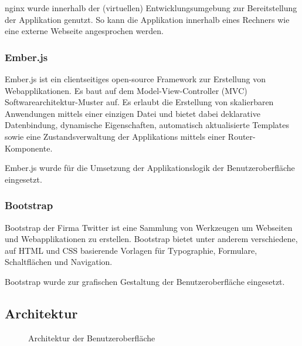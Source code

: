 nginx wurde innerhalb der (virtuellen) Entwicklungsumgebung zur Bereitstellung der Applikation genutzt. So kann die Applikation innerhalb eines Rechners wie eine externe Webseite angesprochen werden.

\subsubsection{Ember.js}
\label{ssubsec:komponenten:gui:komponenten:emberjs}
Ember.js ist ein clientseitiges open-source Framework zur Erstellung von Webapplikationen. Es baut auf dem Model-View-Controller (MVC) Softwarearchitektur-Muster auf. Es erlaubt die Erstellung von skalierbaren Anwendungen mittels einer einzigen Datei und bietet dabei deklarative Datenbindung, dynamische Eigenschaften, automatisch aktualisierte Templates sowie eine Zustandsverwaltung der Applikations mittels einer Router-Komponente.~\cite{ember}

Ember.js wurde für die Umsetzung der Applikationslogik der Benutzeroberfläche eingesetzt.

\subsubsection{Bootstrap}
\label{ssubsec:komponenten:gui:komponenten:bootstrap}
Bootstrap der Firma Twitter ist eine Sammlung von Werkzeugen um Webseiten und Webapplikationen zu erstellen. Bootstrap bietet unter anderem verschiedene, auf HTML und CSS basierende Vorlagen für Typographie, Formulare, Schaltflächen und Navigation.~\cite{bootstrap}

Bootstrap wurde zur grafischen Gestaltung der Benutzeroberfläche eingesetzt.

\subsection{Architektur}
\label{subsec:komponenten:gui:architektur}
\begin{figure}[H]
    \centering {}
    \caption{Architektur der Benutzeroberfläche\label{fig:architektur:gui}\protect\footnotemark}
\end{figure}

